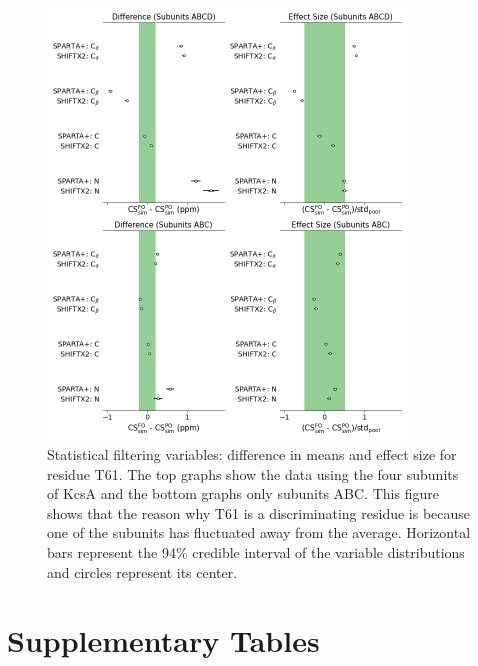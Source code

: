 \documentclass[%
 aip,
 amsmath,amssymb,
 preprint,%
]{revtex4-1}
\begin{document}
\begin{figure}[tbp]
	\includegraphics[width=0.85\textwidth]{figures_SI/statistical_filtering_skew_model_shiftx2_T61.png}
	 \caption{\scriptsize
Statistical filtering variables: difference in means and effect size for residue T61. The top graphs show the data using the four subunits of KcsA and the bottom graphs only subunits ABC. This figure shows that the reason why T61 is a discriminating residue is because one of the subunits has fluctuated away from the average. Horizontal bars represent the 94\% credible interval of the variable distributions and circles represent its center. 
}
\label{SI_stat_filt_T61}
\end{figure}


\clearpage
\section{Supplementary Tables}
\end{document}
